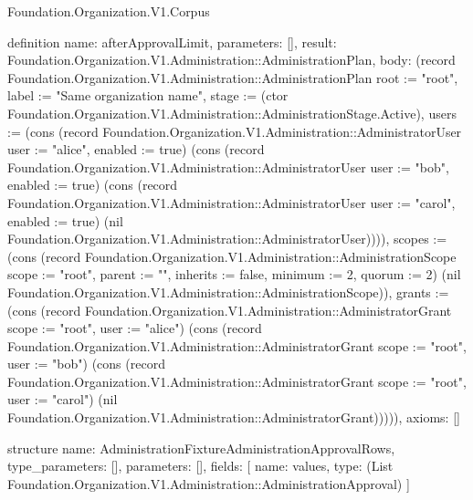 \begin{lexlean}{Foundation.Organization.V1.Corpus}
\begin{semanticmodule}
definition{
  name: afterApprovalLimit,
  parameters: [],
  result: Foundation.Organization.V1.Administration::AdministrationPlan,
  body: (record Foundation.Organization.V1.Administration::AdministrationPlan {root := "root", label := "Same organization name", stage := (ctor Foundation.Organization.V1.Administration::AdministrationStage.Active), users := (cons (record Foundation.Organization.V1.Administration::AdministratorUser {user := "alice", enabled := true}) (cons (record Foundation.Organization.V1.Administration::AdministratorUser {user := "bob", enabled := true}) (cons (record Foundation.Organization.V1.Administration::AdministratorUser {user := "carol", enabled := true}) (nil Foundation.Organization.V1.Administration::AdministratorUser)))), scopes := (cons (record Foundation.Organization.V1.Administration::AdministrationScope {scope := "root", parent := "", inherits := false, minimum := 2, quorum := 2}) (nil Foundation.Organization.V1.Administration::AdministrationScope)), grants := (cons (record Foundation.Organization.V1.Administration::AdministratorGrant {scope := "root", user := "alice"}) (cons (record Foundation.Organization.V1.Administration::AdministratorGrant {scope := "root", user := "bob"}) (cons (record Foundation.Organization.V1.Administration::AdministratorGrant {scope := "root", user := "carol"}) (nil Foundation.Organization.V1.Administration::AdministratorGrant))))}),
  axioms: []
}

structure{
  name: AdministrationFixtureAdministrationApprovalRows,
  type_parameters: [],
  parameters: [],
  fields: [
    {name: values, type: (List Foundation.Organization.V1.Administration::AdministrationApproval)}
  ]
}


\end{semanticmodule}
\end{lexlean}

